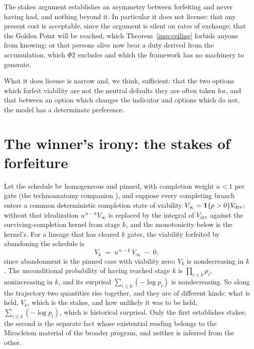 \begin{remark}\label{hr:rem:stakeslimit}
The stakes argument establishes an asymmetry between forfeiting and
never having had, and nothing beyond it. In particular it does not
license: that any present cost is acceptable, since the argument is
silent on rates of exchange; that the Golden Point will be reached,
which Theorem~\ref{imp:ceiling} forbids anyone from knowing; or that
persons alive now bear a duty derived from the accumulation, which
$\Phi2$ excludes and which the framework has no machinery to generate.

What it does license is narrow and, we think, sufficient: that the two
options which forfeit viability are not the neutral defaults they are
often taken for, and that between an option which changes the indicator
and options which do not, the model has a determinate preference.
\end{remark}


\section{The winner's irony: the stakes of forfeiture}\label{sec:irony}

\begin{proposition}\label{hr:rem:monotone}
Let the schedule be homogeneous and pinned, with completion weight
$u<1$ per gate (the technoanatomy companion \cite{GoldenTechnoanatomy}), and suppose
every completing branch enters a common deterministic completion state
of viability $V_\infty=\mathbf{1}\{\rho>0\}V_{\mathrm{drv}}$; without that
idealization $u^{\,n-k}V_\infty$ is replaced by the integral of
$V_{\mathrm{drv}}$ against the surviving-completion kernel from stage
$k$, and the monotonicity below is the kernel's. For a lineage that has
cleared $k$ gates, the viability forfeited by abandoning the schedule
is
\begin{equation}\label{hr:eq:optionvalue}
V_k\;=\;u^{\,n-k}\,V_\infty\;-\;0,
\end{equation}
since abandonment is the pinned case with viability zero; $V_k$ is
nondecreasing in $k$. The unconditional probability of having reached
stage $k$ is $\prod_{i\le k}p_i$, nonincreasing in $k$, and its
surprisal $\sum_{i\le k}(-\log p_i)$ is nondecreasing. So along the
trajectory two quantities rise together, and they are of different
kinds: what is held, $V_k$, which is the stakes, and how unlikely it
was to be held, $\sum_{i\le k}(-\log p_i)$, which is historical
surprisal. Only the first establishes stakes; the second is the
separate fact whose existential reading belongs to the Miracleism
material of the broader program, and neither is inferred from the
other.
\end{proposition}


